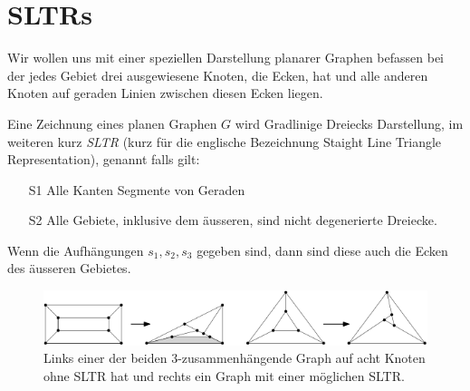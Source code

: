 \section{SLTRs}

Wir wollen uns mit einer speziellen Darstellung planarer Graphen befassen bei der jedes Gebiet drei ausgewiesene Knoten, die Ecken, hat und alle anderen Knoten auf geraden Linien zwischen diesen Ecken liegen.

\begin{definition}[SLTR]\label{defsltr}
Eine Zeichnung eines planen Graphen $G$ wird Gradlinige Dreiecks Darstellung, im weiteren kurz \textit{SLTR} (kurz für die englische Bezeichnung Staight Line Triangle Representation), genannt falls gilt:
\begin{itemize}
\item[S1] Alle Kanten Segmente von Geraden
\item[S2] Alle Gebiete, inklusive dem äusseren, sind nicht degenerierte Dreiecke.
\end{itemize}
Wenn die Aufhängungen $s_1,s_2,s_3$ gegeben sind, dann sind diese auch die Ecken des äusseren Gebietes.
\end{definition}

\begin{figure}
	\centering
  \includegraphics[scale=0.65]{sltr-example.png}
	\caption{Links einer der beiden 3-zusammenhängende Graph auf acht Knoten ohne SLTR hat und rechts ein Graph mit einer möglichen SLTR.}
	\label{cut_figure}
\end{figure}